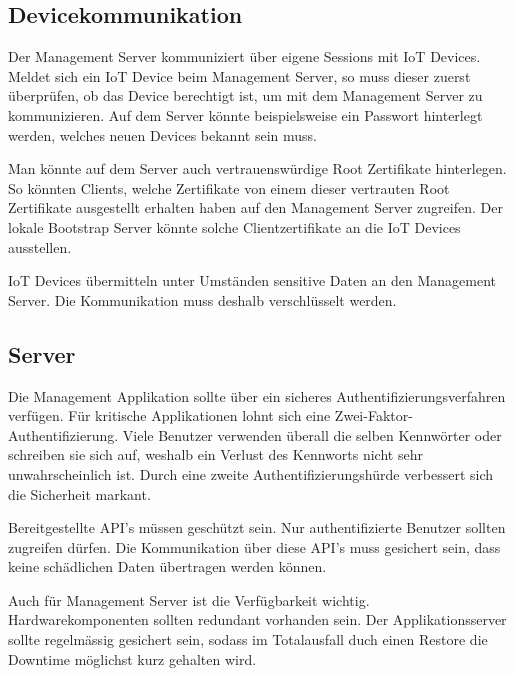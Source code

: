 \subsection{Devicekommunikation}
Der Management Server kommuniziert über eigene Sessions mit IoT Devices. Meldet sich ein IoT Device beim Management Server, so muss dieser zuerst überprüfen, ob das Device berechtigt ist, um mit dem Management Server zu kommunizieren. Auf dem Server könnte beispielsweise ein Passwort hinterlegt werden, welches neuen Devices bekannt sein muss. 

Man könnte auf dem Server auch vertrauenswürdige Root Zertifikate hinterlegen. So könnten Clients, welche Zertifikate von einem dieser vertrauten Root Zertifikate ausgestellt erhalten haben auf den Management Server zugreifen. Der lokale Bootstrap Server könnte solche Clientzertifikate an die IoT Devices ausstellen.

IoT Devices übermitteln unter Umständen sensitive Daten an den Management Server. Die Kommunikation muss deshalb verschlüsselt werden.

\subsection{Server}
Die Management Applikation sollte über ein sicheres Authentifizierungsverfahren verfügen. Für kritische Applikationen lohnt sich eine Zwei-Faktor-Authentifizierung. Viele Benutzer verwenden überall die selben Kennwörter oder schreiben sie sich auf, weshalb ein Verlust des Kennworts nicht sehr unwahrscheinlich ist. Durch eine zweite Authentifizierungshürde verbessert sich die Sicherheit markant.

Bereitgestellte API's müssen geschützt sein. Nur authentifizierte Benutzer sollten zugreifen dürfen. Die Kommunikation über diese API's muss gesichert sein, dass keine schädlichen Daten übertragen werden können. 

Auch für Management Server ist die Verfügbarkeit wichtig. Hardwarekomponenten sollten redundant vorhanden sein. Der Applikationsserver sollte regelmässig gesichert sein, sodass im Totalausfall duch einen Restore die Downtime möglichst kurz gehalten wird.




